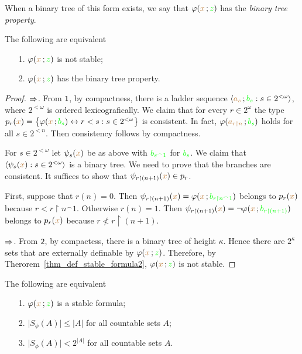 \documentclass[creche.tex]{subfiles}
\begin{document}
\medskip
When a binary tree of this form exists, we say that $\varphi({\color{brown} x}\,;{\color{green} z})$ has the \emph{binary tree property}.

\begin{theorem}\label{thm_count_types}
  The following are equivalent
  \begin{itemize}
  \item[1.] $\varphi({\color{brown} x}\,;{\color{green} z})$ is not stable;
  \item[2.] $\varphi({\color{brown} x}\,;{\color{green} z})$ has the binary tree property.
  \end{itemize}
\end{theorem}

\begin{proof}
  $\Rightarrow$.
  From $\textsf{\small 1}$, by compactness, there is a ladder sequence  $\langle{\color{brown}a_s}\,;{\color{green} b_s} : s\in2^{<\omega}\rangle$, where $2^{<\omega}$ is ordered lexicografically.
  We claim that for every $r\in2^\omega$ the type $p_r({\color{brown} x})=\big\{\varphi({\color{brown} x}\,;{\color{green} b_s})\leftrightarrow r<s : s\in2^{<\omega}\big\}$ is consistent. 
  In fact, $\varphi({\color{brown} a_{r\restriction n}}\,;{\color{green} b_s})$ holds for all $s\in2^{<n}$.
  Then consistency follows by compactness.

  For $s\in2^{<\omega}$ let $\psi_s({\color{brown} x})$ be as above with ${\color{green} b_{s^\frown1}}$ for ${\color{green} b_s}$.
  We claim that $\langle\psi_s({\color{brown} x}):s\in 2^{<\omega}\rangle$ is a binary tree.
  We need to prove that the branches are consistent.
  It suffices to show that $\psi_{r\restriction (n+1)}({\color{brown} x})\in p_r$.

  First, suppose that $r(n)=0$. 
  Then $\psi_{r\restriction (n+1)}({\color{brown} x})=\varphi({\color{brown} x}\,;{\color{green} b_{r\restriction n^\frown1}})$ belongs to $p_r({\color{brown} x})$ because $r<r{\restriction} n^\frown1$.
  Otherwise $r(n)=1$. 
  Then $\psi_{r\restriction (n+1)}({\color{brown} x})=\neg\varphi({\color{brown} x}\,;{\color{green} b_{r\restriction(n+1)}})$ belongs to $p_r({\color{brown} x})$ because $r\not< r{\restriction}(n+1)$.

  $\Rightarrow$. From $\textsf{\small 2}$, by compactess, there is a binary tree of height $\kappa$. 
  Hence there are $2^\kappa$ sets that are externally definable by $\varphi({\color{brown} x}\,;{\color{green} z})$.
  Therefore, by Therorem~\ref{thm_def_stable_formula2}, $\varphi({\color{brown} x}\,;{\color{green} z})$ is not stable.
\end{proof}

\begin{corollary}\label{corol_count_types}
The following are equivalent
\begin{itemize}
\item[1.] $\varphi({\color{brown} x}\,;{\color{green} z})$ is a stable formula;
\item[2.] $\big|S_{\phi}(A)\big|\le|A|$ for all countable sets $A$;
\item[3.] $\big|S_{\phi}(A)\big|<2^{|A|}$ for all countable sets $A$.
\end{itemize}
\end{corollary}
\end{document}
